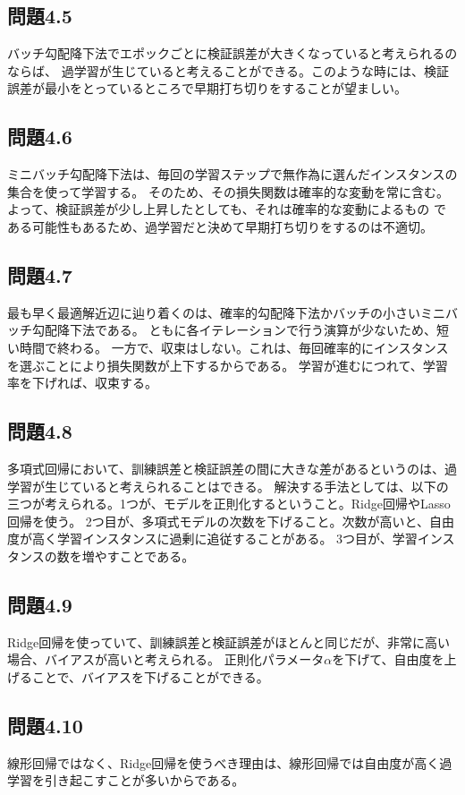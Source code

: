 \documentclass[a4j,twocolumn]{jsarticle}
\begin{document}
\subsection{問題4.5}
バッチ勾配降下法でエポックごとに検証誤差が大きくなっていると考えられるのならば、
過学習が生じていると考えることができる。このような時には、検証誤差が最小をとっているところで早期打ち切りをすることが望ましい。

\subsection{問題4.6}
ミニバッチ勾配降下法は、毎回の学習ステップで無作為に選んだインスタンスの集合を使って学習する。
そのため、その損失関数は確率的な変動を常に含む。よって、検証誤差が少し上昇したとしても、それは確率的な変動によるもの
である可能性もあるため、過学習だと決めて早期打ち切りをするのは不適切。

\subsection{問題4.7}
最も早く最適解近辺に辿り着くのは、確率的勾配降下法かバッチの小さいミニバッチ勾配降下法である。
ともに各イテレーションで行う演算が少ないため、短い時間で終わる。
一方で、収束はしない。これは、毎回確率的にインスタンスを選ぶことにより損失関数が上下するからである。
学習が進むにつれて、学習率を下げれば、収束する。

\subsection{問題4.8}
多項式回帰において、訓練誤差と検証誤差の間に大きな差があるというのは、過学習が生じていると考えられることはできる。
解決する手法としては、以下の三つが考えられる。1つが、モデルを正則化するということ。Ridge回帰やLasso回帰を使う。
2つ目が、多項式モデルの次数を下げること。次数が高いと、自由度が高く学習インスタンスに過剰に追従することがある。
3つ目が、学習インスタンスの数を増やすことである。

\subsection{問題4.9}
Ridge回帰を使っていて、訓練誤差と検証誤差がほとんと同じだが、非常に高い場合、バイアスが高いと考えられる。
正則化パラメータ$\alpha$を下げて、自由度を上げることで、バイアスを下げることができる。

\subsection{問題4.10}
線形回帰ではなく、Ridge回帰を使うべき理由は、線形回帰では自由度が高く過学習を引き起こすことが多いからである。
\end{document}
